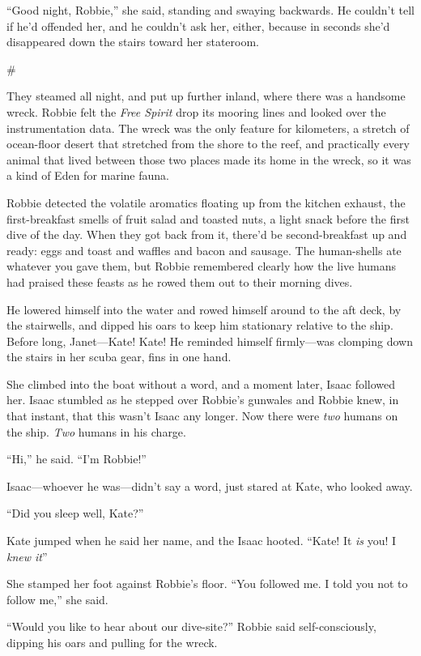 “Good night, Robbie,” she said, standing and swaying backwards. He
couldn’t tell if he’d offended her, and he couldn’t ask her,
either, because in seconds she’d disappeared down the stairs toward
her stateroom.

\#

They steamed all night, and put up further inland, where there was
a handsome wreck. Robbie felt the \emph{Free Spirit} drop its
mooring lines and looked over the instrumentation data. The wreck
was the only feature for kilometers, a stretch of ocean-floor
desert that stretched from the shore to the reef, and practically
every animal that lived between those two places made its home in
the wreck, so it was a kind of Eden for marine fauna.

Robbie detected the volatile aromatics floating up from the kitchen
exhaust, the first-breakfast smells of fruit salad and toasted
nuts, a light snack before the first dive of the day. When they got
back from it, there’d be second-breakfast up and ready: eggs and
toast and waffles and bacon and sausage. The human-shells ate
whatever you gave them, but Robbie remembered clearly how the live
humans had praised these feasts as he rowed them out to their
morning dives.

He lowered himself into the water and rowed himself around to the
aft deck, by the stairwells, and dipped his oars to keep him
stationary relative to the ship. Before long, Janet—Kate! Kate! He
reminded himself firmly—was clomping down the stairs in her scuba
gear, fins in one hand.

She climbed into the boat without a word, and a moment later, Isaac
followed her. Isaac stumbled as he stepped over Robbie’s gunwales
and Robbie knew, in that instant, that this wasn’t Isaac any
longer. Now there were \emph{two} humans on the ship. \emph{Two}
humans in his charge.

“Hi,” he said. “I’m Robbie!”

Isaac—whoever he was—didn’t say a word, just stared at Kate, who
looked away.

“Did you sleep well, Kate?”

Kate jumped when he said her name, and the Isaac hooted. “Kate! It
\emph{is} you! I \emph{knew it}”

She stamped her foot against Robbie’s floor. “You followed me. I
told you not to follow me,” she said.

“Would you like to hear about our dive-site?” Robbie said
self-consciously, dipping his oars and pulling for the wreck.

